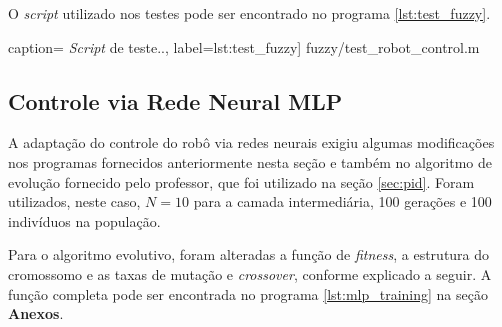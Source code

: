 	\FloatBarrier
		
	O \textit{script} utilizado nos testes pode ser encontrado no programa
	\ref{lst:test_fuzzy}.
	
	 caption={  
	\textit{Script} de teste..}, label={lst:test_fuzzy}]
	{fuzzy/test_robot_control.m}

	\subsection {Controle via Rede Neural MLP}
	
	A adaptação do controle do robô via redes neurais exigiu algumas modificações
	nos programas fornecidos anteriormente nesta seção e também no algoritmo de
	evolução fornecido pelo professor, que foi utilizado na seção \ref{sec:pid}.
	Foram utilizados, neste caso, \(N = 10\) para a camada intermediária, 100
	gerações e 100 indivíduos na população.
	
	\vspace{12pt}
	
	Para o algoritmo evolutivo, foram alteradas a função de \textit{fitness}, a
	estrutura do cromossomo e as taxas de mutação e \textit{crossover}, conforme
	explicado a seguir. A função completa pode ser encontrada no programa
	\ref{lst:mlp_training} na seção \textbf{Anexos}.
	
